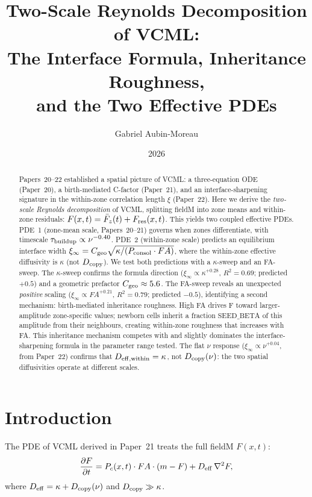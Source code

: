 \documentclass[11pt]{article}
\title{Two-Scale Reynolds Decomposition of VCML:\\
       The Interface Formula, Inheritance Roughness,\\
       and the Two Effective PDEs}
\author{Gabriel Aubin-Moreau}
\date{2026}
\begin{document}
\maketitle

\begin{abstract}
Papers~20--22 established a spatial picture of VCML:
a three-equation ODE (Paper~20), a birth-mediated C-factor (Paper~21),
and an interface-sharpening signature in the within-zone correlation
length $\xi$ (Paper~22).
Here we derive the \emph{two-scale Reynolds decomposition} of VCML,
splitting fieldM into zone means and within-zone residuals:
$F(x,t) = \bar{F}_z(t) + F_{\rm res}(x,t)$.
This yields two coupled effective PDEs.
PDE~1 (zone-mean scale, Papers~20--21) governs when zones differentiate,
with timescale $\tau_{\rm buildup} \propto \nu^{-0.40}$.
PDE~2 (within-zone scale) predicts an equilibrium interface width
$\xi_\infty = C_{\rm geo}\sqrt{\kappa/(P_{\rm consol}\cdot FA)}$,
where the within-zone effective diffusivity is $\kappa$ (not $D_{\rm copy}$).
We test both predictions with a $\kappa$-sweep and an FA-sweep.
The $\kappa$-sweep confirms the formula direction
($\xi_\infty \propto \kappa^{+0.28}$, $R^2=0.69$; predicted $+0.5$)
and a geometric prefactor $C_{\rm geo} \approx 5.6$.
The FA-sweep reveals an unexpected \emph{positive} scaling
($\xi_\infty \propto FA^{+0.21}$, $R^2=0.79$; predicted $-0.5$),
identifying a second mechanism: birth-mediated inheritance roughness.
High FA drives F toward larger-amplitude zone-specific values;
newborn cells inherit a fraction $\mathrm{SEED\_BETA}$ of this amplitude
from their neighbours, creating within-zone roughness that increases with FA.
This inheritance mechanism competes with and slightly dominates the
interface-sharpening formula in the parameter range tested.
The flat $\nu$ response ($\xi_\infty \propto \nu^{+0.04}$, from Paper~22)
confirms that $D_{\rm eff,within} = \kappa$, not $D_{\rm copy}(\nu)$:
the two spatial diffusivities operate at different scales.
\end{abstract}

\section{Introduction}

The PDE of VCML derived in Paper~21 treats the full fieldM $F(x,t)$:
\begin{equation}
  \frac{\partial F}{\partial t}
  = P_c(x,t)\cdot FA\cdot(m - F) + D_{\rm eff}\,\nabla^2 F,
  \label{eq:full}
\end{equation}
where $D_{\rm eff} = \kappa + D_{\rm copy}(\nu)$ and $D_{\rm copy} \gg \kappa$.
\end{document}
